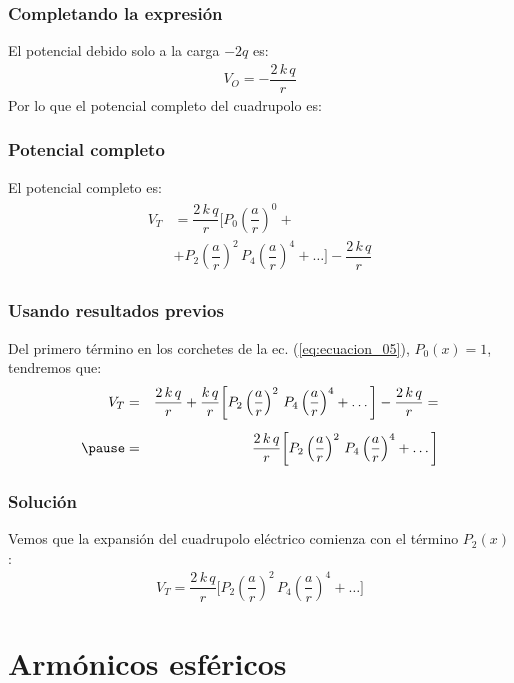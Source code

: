 \begin{frame}
\frametitle{Completando la expresión}
El potencial debido solo a la carga $-2q$ es:
\begin{align*}
V_{O} = - \dfrac{2 \, k \, q}{r}
\end{align*}
\pause
Por lo que el potencial completo del cuadrupolo es:
\end{frame}
\begin{frame}
\frametitle{Potencial completo}
El potencial completo es:
\begin{align}
\begin{aligned}
V_{T} &= \dfrac{2 \, k \, q}{r} \bigg[ P_{0} \left( \dfrac{a}{r} \right)^{0} + \\[0.5em]
&+ P_{2} \left( \dfrac{a}{r} \right)^{2} \, P_{4} \left( \dfrac{a}{r} \right)^{4} + \ldots \bigg] - \dfrac{2 \, k \, q}{r}
\end{aligned}
\label{eq:ecuacion_05}
\end{align}
\end{frame}
\begin{frame}
\frametitle{Usando resultados previos}
Del primero término en los corchetes de la ec. (\ref{eq:ecuacion_05}), $P_{0}(x) = 1$, tendremos que:
\begin{eqnarray*}
V_{T} &=& \dfrac{2 \, k \, q}{r} + \dfrac{k \, q}{r} \bigg[ P_{2} \left( \dfrac{a}{r} \right)^{2} \, P_{4} \left( \dfrac{a}{r} \right)^{4} + \ldots \bigg] - \dfrac{2 \, k \, q}{r} = \\[0.5em] \pause
&=& \dfrac{2 \, k \, q}{r} \bigg[ P_{2} \left( \dfrac{a}{r} \right)^{2} \, P_{4} \left( \dfrac{a}{r} \right)^{4} + \ldots \bigg]
\end{eqnarray*}
\end{frame}
\begin{frame}
\frametitle{Solución}
Vemos que la expansión del cuadrupolo eléctrico comienza con el término $P_{2}(x)$:
\begin{align*}
V_{T} = \dfrac{2 \, k \, q}{r} \bigg[ P_{2} \left( \dfrac{a}{r} \right)^{2} \, P_{4} \left( \dfrac{a}{r} \right)^{4} + \ldots \bigg]
\end{align*}
\end{frame}
\section{Armónicos esféricos}
